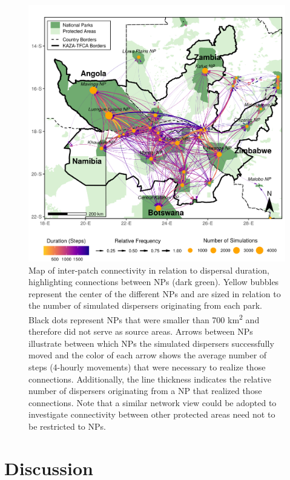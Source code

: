 \documentclass[abstract=on,10pt,a4paper,bibliography=totocnumbered]{article}
\begin{document}
\begin{figure}
  \includegraphics[width=\textwidth]{99_InterpatchConnectivity.png}
  \caption{Map of inter-patch connectivity in relation to dispersal duration,
  highlighting connections between NPs (dark green). Yellow bubbles represent
  the center of the different NPs and are sized in relation to the number of
  simulated dispersers originating from each park. Black dots represent NPs that
  were smaller than 700 km\textsuperscript{2} and therefore did not serve as
  source areas. Arrows between NPs illustrate between which NPs the simulated
  dispersers successfully moved and the color of each arrow shows the average
  number of steps (4-hourly movements) that were necessary to realize those
  connections. Additionally, the line thickness indicates the relative number of
  dispersers originating from a NP that realized those connections. Note that a
  similar network view could be adopted to investigate connectivity between
  other protected areas need not to be restricted to NPs.}
  \label{InterpatchConnectivity}
\end{figure}

\section{Discussion}
\end{document}
